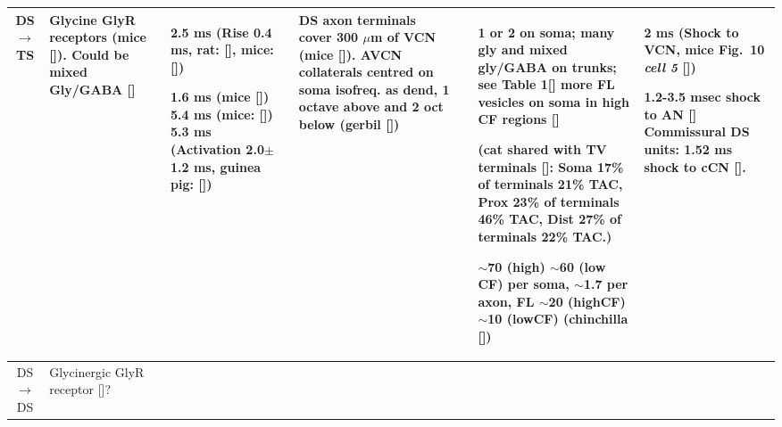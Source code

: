 \begin{longtable}{cYYYYYY}
DS\ensuremath{\rightarrow}TS                        
                                & %
Glycine GlyR receptors (mice []).
Could be mixed Gly/GABA [] 
                                & %
2.5 ms (Rise 0.4 ms, rat: [],
mice: [])


1.6 ms (mice [])
5.4 ms (mice: [])    
5.3 ms (Activation 2.0$\pm$1.2 ms, guinea pig: [])
                                & %
DS axon terminals cover 300 $\mu$m of VCN (mice []).
AVCN collaterals centred on soma isofreq. as dend, 1 octave above and 2 oct below (gerbil []) 
                                & %

                                & %
1 or 2 on soma; many gly and mixed gly/GABA on trunks; see Table 1[] 
more FL vesicles on soma in high CF regions []      

(cat shared with TV terminals []: 
Soma 17\% of terminals 21\% TAC,
Prox 23\% of terminals 46\% TAC,
Dist 27\% of terminals 22\% TAC.)


$\sim$70 (high) $\sim$60 (low CF) per soma, 
$\sim$1.7 per axon, FL $\sim$20 (highCF)
$\sim$10 (lowCF) (chinchilla [])                

                                & 
2 ms (Shock to VCN, mice Fig.~10 \textit{cell 5} [])

1.2-3.5 msec shock to AN []
Commissural DS units: 1.52 ms shock to cCN [].
\\ \midrule
DS\ensuremath{\rightarrow}DS                        
                                & %
Glycinergic GlyR receptor                  []?                    
                                & %


\end{longtable}
